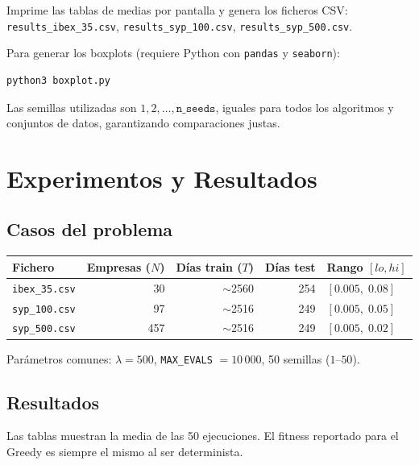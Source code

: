 \documentclass[12pt,a4paper]{article}
\begin{document}
Imprime las tablas de medias por pantalla y genera los ficheros CSV:
\texttt{results\_ibex\_35.csv}, \texttt{results\_syp\_100.csv},
\texttt{results\_syp\_500.csv}.

Para generar los boxplots (requiere Python con \texttt{pandas} y \texttt{seaborn}):

\begin{verbatim}
python3 boxplot.py
\end{verbatim}

Las semillas utilizadas son $1, 2, \ldots, \texttt{n\_seeds}$, iguales
para todos los algoritmos y conjuntos de datos, garantizando comparaciones justas.

\section{Experimentos y Resultados}
\label{sec:experimentos}

\subsection{Casos del problema}

\begin{center}
\begin{tabular}{lrrrl}
\toprule
\textbf{Fichero} & \textbf{Empresas ($N$)} & \textbf{Días train ($T$)} & \textbf{Días test} & \textbf{Rango $[lo, hi]$} \\
\midrule
\texttt{ibex\_35.csv}  & 30  & $\sim$2560 & 254 & $[0.005,\; 0.08]$ \\
\texttt{syp\_100.csv}  & 97  & $\sim$2516 & 249 & $[0.005,\; 0.05]$ \\
\texttt{syp\_500.csv}  & 457 & $\sim$2516 & 249 & $[0.005,\; 0.02]$ \\
\bottomrule
\end{tabular}
\end{center}

Parámetros comunes: $\lambda = 500$, \texttt{MAX\_EVALS} $= 10\,000$,
50 semillas ($1$--$50$).

\subsection{Resultados}

Las tablas muestran la media de las 50 ejecuciones. El fitness reportado para el
Greedy es siempre el mismo al ser determinista.
\end{document}
